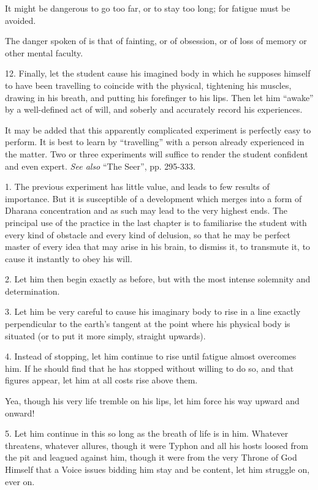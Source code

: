 It might be dangerous to go too far, or to stay too long; for fatigue must be avoided.

The danger spoken of is that of fainting, or of obsession, or of loss of memory or other mental faculty.

12. Finally, let the student cause his imagined body in which he supposes himself to have been travelling to coincide with the physical, tightening his muscles, drawing in his breath, and putting his forefinger to his lips. Then let him \enquote{awake} by a well-defined act of will, and soberly and accurately record his experiences.

It may be added that this apparently complicated experiment is perfectly easy to perform. It is best to learn by \enquote{travelling} with a person already experienced in the matter. Two or three experiments will suffice to render the student confident and even expert. \textit{See also} \enquote{The Seer}, pp. 295-333.




1. The previous experiment has little value, and leads to few results of importance. But it is susceptible of a development which merges into a form of Dharana \textemdash{} concentration \textemdash{} and as such may lead to the very highest ends. The principal use of the practice in the last chapter is to familiarise the student with every kind of obstacle and every kind of delusion, so that he may be perfect master of every idea that may arise in his brain, to dismiss it, to transmute it, to cause it instantly to obey his will.

2. Let him then begin exactly as before, but with the most intense solemnity and determination.

3. Let him be very careful to cause his imaginary body to rise in a line exactly perpendicular to the earth's tangent at the point where his physical body is situated (or to put it more simply, straight upwards).

4. Instead of stopping, let him continue to rise until fatigue almost overcomes him. If he should find that he has stopped without willing to do so, and that figures appear, let him at all costs rise above them.

Yea, though his very life tremble on his lips, let him force his way upward and onward!

5. Let him continue in this so long as the breath of life is in him. Whatever threatens, whatever allures, though it were Typhon and all his hosts loosed from the pit and leagued against him, though it were from the very Throne of God Himself that a Voice issues bidding him stay and be content, let him struggle on, ever on.

